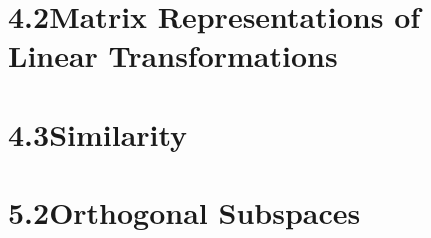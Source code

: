 \documentclass[12pt, letterpaper]{article}
\theoremstyle{remark}
\theoremstyle{remark}
\begin{document}
\section*{4.2\quad{}Matrix Representations of Linear Transformations}

\section*{4.3\quad{}Similarity}

\section*{5.2\quad{}Orthogonal Subspaces}
\end{document}
